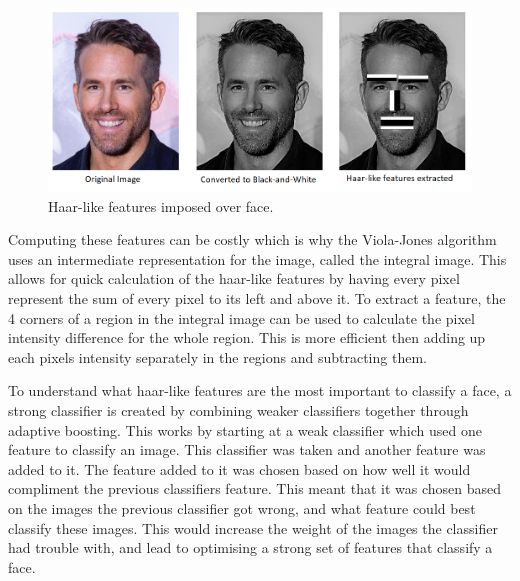 \documentclass{l4proj}
\begin{document}
\begin{figure}[h!]
\centering
  \begin{minipage}{\textwidth}
    \includegraphics[width=\textwidth]{images/haarlike_features_face.png}
    \caption{Haar-like features imposed over face. }
    \label{haarlike_features_face}
  \end{minipage}  
\end{figure}

Computing these features can be costly which is why the Viola-Jones algorithm uses an intermediate representation for the image, called the integral image. This allows for quick calculation of the haar-like features by having every pixel represent the sum of every pixel to its left and above it. To extract a feature, the 4 corners of a region in the integral image can be used to calculate the pixel intensity difference for the whole region. This is more efficient then adding up each pixels intensity separately in the regions and subtracting them. 

To understand what haar-like features are the most important to classify a face, a strong classifier is created by combining weaker classifiers together through adaptive boosting. This works by starting at a weak classifier which used one feature to classify an image. This classifier was taken and another feature was added to it. The feature added to it was chosen based on how well it would compliment the previous classifiers feature. This meant that it was chosen based on the images the previous classifier got wrong, and what feature could best classify these images. This would increase the weight of the images the classifier had trouble with, and lead to optimising a strong set of features that classify a face.
\end{document}
